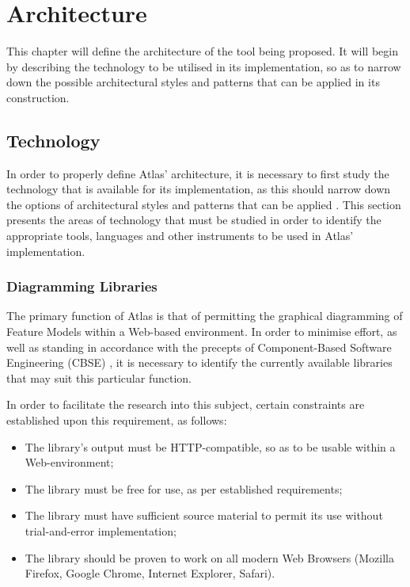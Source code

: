 \chapter{Architecture}
\label{chap:architecture}

This chapter will define the architecture of the tool being proposed. It will begin by describing the technology to be utilised in its implementation, so as to narrow down the possible architectural styles and patterns that can be applied in its construction.


\section{Technology}

In order to properly define Atlas' architecture, it is necessary to first study the technology that is available for its implementation, as this should narrow down the options of architectural styles and patterns that can be applied \cite{TAYLOR:2009}. This section presents the areas of technology that must be studied in order to identify the appropriate tools, languages and other instruments to be used in Atlas' implementation.


\subsection{Diagramming Libraries}
\label{sec:diaglibs}

The primary function of Atlas is that of permitting the graphical diagramming of Feature Models within a Web-based environment. In order to minimise effort, as well as standing in accordance with the precepts of Component-Based Software Engineering (CBSE) \cite{JIFENG:2005} \cite{CRNKOVIC:2002a}, it is necessary to identify the currently available libraries that may suit this particular function.

In order to facilitate the research into this subject, certain constraints are established upon this requirement, as follows:

\begin{itemize}
    \item The library's output must be HTTP-compatible, so as to be usable within a Web-environment;
    \item The library must be free for use, as per established requirements;
    \item The library must have sufficient source material to permit its use without trial-and-error implementation;
    \item The library should be proven to work on all modern Web Browsers (Mozilla Firefox, Google Chrome, Internet Explorer, Safari).
\end{itemize}

